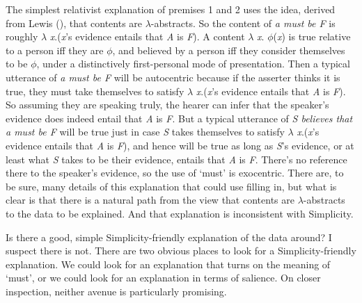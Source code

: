 \documentclass[
  10pt,
  letterpaper,
  DIV=11,
  numbers=noendperiod,
  twoside]{scrartcl}
\begin{document}
The simplest relativist explanation of premises 1 and 2 uses the idea,
derived from Lewis (), that contents are
\(\lambda\)-abstracts. So the content of \emph{a must be F} is roughly
\(\lambda\) \emph{x}.(\emph{x}'s evidence entails that \emph{A} is
\emph{F}). A content \(\lambda\) \emph{x}. \(\phi\)(\emph{x}) is true
relative to a person iff they are \(\phi\), and believed by a person iff
they consider themselves to be \(\phi\), under a distinctively
first-personal mode of presentation. Then a typical utterance of \emph{a
must be F} will be autocentric because if the asserter thinks it is
true, they must take themselves to satisfy \(\lambda\)
\emph{x}.(\emph{x}'s evidence entails that \emph{A} is \emph{F}). So
assuming they are speaking truly, the hearer can infer that the
speaker's evidence does indeed entail that \emph{A} is \emph{F}. But a
typical utterance of \emph{S believes that a must be F} will be true
just in case \emph{S} takes themselves to satisfy \(\lambda\)
\emph{x}.(\emph{x}'s evidence entails that \emph{A} is \emph{F}), and
hence will be true as long as \emph{S}'s evidence, or at least what
\emph{S} takes to be their evidence, entails that \emph{A} is \emph{F}.
There's no reference there to the speaker's evidence, so the use of
`must' is exocentric. There are, to be sure, many details of this
explanation that could use filling in, but what is clear is that there
is a natural path from the view that contents are \(\lambda\)-abstracts
to the data to be explained. And that explanation is inconsistent with
Simplicity.

Is there a good, simple Simplicity-friendly explanation of the data
around? I suspect there is not. There are two obvious places to look for
a Simplicity-friendly explanation. We could look for an explanation that
turns on the meaning of `must', or we could look for an explanation in
terms of salience. On closer inspection, neither avenue is particularly
promising.
\end{document}
